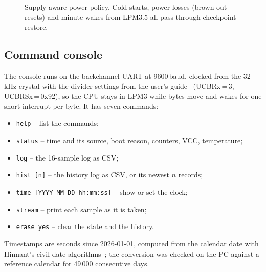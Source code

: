 \documentclass[11pt,a4paper]{article}
\newcommand{\code}[1]{\texttt{#1}}
\begin{document}
\begin{figure}[tbp]
\centering
{}
\caption{Supply-aware power policy. Cold starts, power losses (brown-out resets) and minute wakes from LPM3.5 all pass through checkpoint restore.}
\label{fig:fsm}
\end{figure}

\subsection{Command console}

The console runs on the backchannel UART at 9600\,baud, clocked from the 32\,kHz crystal with the divider settings from the user's guide~\cite{ti_slau367} (UCBRx\,=\,3, UCBRSx\,=\,0x92), so the CPU stays in LPM3 while bytes move and wakes for one short interrupt per byte. It has seven commands:
\begin{itemize}
  \item \code{help} -- list the commands;
  \item \code{status} -- time and its source, boot reason, counters, VCC, temperature;
  \item \code{log} -- the 16-sample log as CSV;
  \item \code{hist [n]} -- the history log as CSV, or its newest $n$ records;
  \item \code{time [YYYY-MM-DD hh:mm:ss]} -- show or set the clock;
  \item \code{stream} -- print each sample as it is taken;
  \item \code{erase yes} -- clear the state and the history.
\end{itemize}
Timestamps are seconds since 2026-01-01, computed from the calendar date with Hinnant's civil-date algorithms~\cite{hinnant_date}; the conversion was checked on the PC against a reference calendar for 49\,000 consecutive days.
\end{document}
